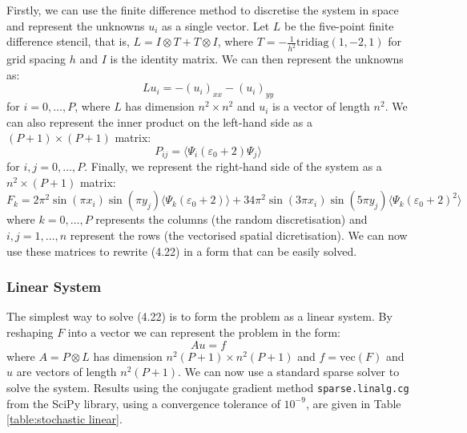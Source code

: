 \documentclass[11pt]{article}
\numberwithin{equation}{section}
\begin{document}
Firstly, we can use the finite difference method to discretise the system in space and represent the unknowns $u_i$ as a single vector. Let $L$ be the five-point finite difference stencil, that is, $L= I \otimes T + T \otimes I$, where $T=-\frac{1}{h^2} \text{tridiag}(1,-2,1)$ for grid spacing $h$ and $I$ is the identity matrix. We can then represent the unknowns as:
\begin{equation}
Lu_i = - (u_i)_{xx} - (u_i)_{yy}
\end{equation}
for $i=0,\dots,P$, where $L$ has dimension $n^2 \times n^2$ and $u_i$ is a vector of length $n^2$. We can also represent the inner product on the left-hand side as a $(P+1) \times (P+1)$ matrix:
\begin{equation}
P_{ij} = \langle \Psi_i (\varepsilon_0 + 2) \Psi_j \rangle
\end{equation}
for $i,j = 0,\dots,P$. Finally, we represent the right-hand side of the system as a $n^2 \times (P+1)$ matrix:
\begin{equation}
F_{k} = 2\pi^2 \sin(\pi x_i)\sin(\pi y_j) \langle \Psi_k (\varepsilon_0 + 2) \rangle + 34\pi^2 \sin(3\pi x_i) \sin(5\pi y_j) \langle \Psi_k (\varepsilon_0 + 2)^2 \rangle
\end{equation}
where $k = 0, \dots, P$ represents the columns (the random discretisation) and $i,j = 1, \dots, n$ represent the rows (the vectorised spatial dicretisation). We can now use these matrices to rewrite (4.22) in a form that can be easily solved.

\subsubsection*{Linear System}
The simplest way to solve (4.22) is to form the problem as a linear system. By reshaping $F$ into a vector we can represent the problem in the form:
\begin{equation}
Au = f
\end{equation} 
where $A = P \otimes L$ has dimension $n^2(P+1) \times n^2(P+1)$ and $f = \text{vec}(F)$ and $u$ are vectors of length $n^2(P+1)$. We can now use a standard sparse solver to solve the system. Results using the conjugate gradient method \texttt{sparse.linalg.cg} from the SciPy library, using a convergence tolerance of $10^{-9}$, are given in Table \ref{table:stochastic linear}.
\end{document}
